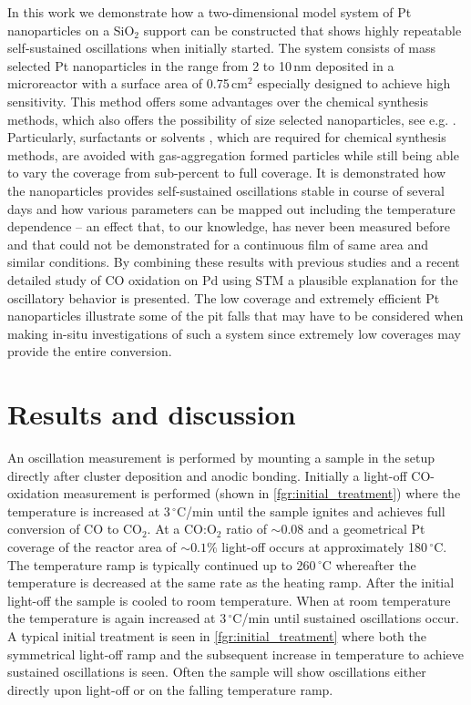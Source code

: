 \documentclass[journal=jacsat,manuscript=article]{achemso}
\begin{document}
In this work we demonstrate how a two-dimensional model system of Pt
nanoparticles on a SiO$_2$ support can be constructed that shows highly
repeatable self-sustained oscillations when initially started. The system
consists of mass selected Pt nanoparticles in the range from 2 to 10\,nm 
deposited in a microreactor with a surface area of 0.75\,cm$^2$
especially designed to achieve high sensitivity\cite{Henriksen2009}. This
method offers some advantages over the chemical synthesis methods, which also
offers the possibility of size selected nanoparticles, see e.g.
\cite{Tsang2008,Shao2011}. Particularly, surfactants or solvents
\cite{Biacchi2011}, which are required for
chemical synthesis methods, are avoided with gas-aggregation formed particles
while still being able to vary the coverage from sub-percent to full coverage.
It is demonstrated how the nanoparticles provides self-sustained
oscillations stable in course of several days and how various parameters can be mapped out
including the temperature dependence -- an effect that, to our knowledge, has
never been measured before and that could
not be demonstrated for a continuous film of same area and similar conditions.
By combining these results with previous studies \cite{Carlsson2006,Singh2010}
and a recent detailed study of CO oxidation on Pd using STM
\cite{Hendriksen2010} a plausible explanation for the oscillatory behavior is
presented. The low coverage and extremely efficient Pt nanoparticles illustrate
some of the pit falls that may have to be considered when making in-situ
investigations of such a system since extremely low coverages may provide the
entire conversion.

\section{Results and discussion}
An oscillation measurement is performed by mounting a sample in the setup
directly after cluster deposition and anodic bonding. Initially a light-off
CO-oxidation measurement is performed (shown in \ref{fgr:initial_treatment}) where
the temperature is increased at 3\,$^\circ$C/min until the sample ignites and
achieves full conversion of CO to CO$_2$. At a CO:O$_2$ ratio of $\sim0.08$ and a
geometrical Pt coverage of the reactor area of $\sim0.1\%$ light-off occurs at approximately
180\,$^\circ$C. The temperature ramp is typically continued up to
260\,$^\circ$C whereafter the temperature is decreased at the same rate as the
heating ramp. After the initial light-off the sample is cooled to room
temperature. When at room temperature the temperature is again increased at
3\,$^\circ$C/min until sustained oscillations occur. A typical initial
treatment is seen in \ref{fgr:initial_treatment} where both the symmetrical
light-off ramp and the subsequent increase in temperature to achieve sustained
oscillations is seen. Often the sample will show oscillations either directly
upon light-off or on the falling temperature ramp.
\end{document}

